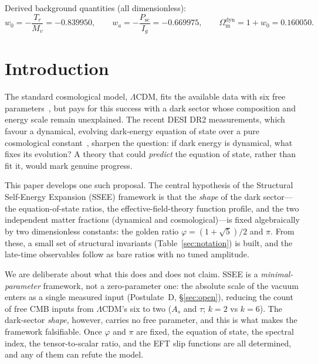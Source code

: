 \documentclass[aps,prd,preprint,amsmath,amssymb,nofootinbib,longbibliography]{revtex4-2}
\newcommand{\Om}{\Omega_{\mathrm{m}}}
\begin{document}
\noindent Derived background quantities (all dimensionless):
\begin{equation*}
w_0=-\frac{T_r}{M_v}=-0.839950,\qquad
w_a=-\frac{P_{\mathrm{sc}}}{I_g}=-0.669975,\qquad
\Om^{\mathrm{dyn}}=1+w_0=0.160050 .
\end{equation*}


\section{Introduction}
\label{sec:intro}

The standard cosmological model, $\Lambda$CDM, fits the available data with six
free parameters~\citep{Planck2018}, but pays for this success with a dark sector whose composition
and energy scale remain unexplained. The recent DESI DR2 measurements, which
favour a dynamical, evolving dark-energy equation of state over a pure
cosmological constant~\citep{AbdulKarim2025}, sharpen the question: if dark
energy is dynamical, what fixes its evolution? A theory that could
\emph{predict} the equation of state, rather than fit it, would mark genuine
progress.

This paper develops one such proposal. The central hypothesis of the
Structural Self-Energy Expansion (SSEE) framework is that the \emph{shape} of
the dark sector---the equation-of-state ratios, the effective-field-theory
function profile, and the two independent matter fractions (dynamical and
cosmological)---is fixed algebraically by two dimensionless constants: the golden
ratio $\varphi=(1+\sqrt5)/2$ and $\pi$. From these, a small set of structural
invariants (Table~\ref{sec:notation}) is built, and the late-time observables
follow as bare ratios with no tuned amplitude.

We are deliberate about what this does and does not claim. SSEE is a
\emph{minimal-parameter} framework, not a zero-parameter one: the absolute scale
of the vacuum enters as a single measured input (Postulate~D,
\S\ref{sec:open}), reducing the count of free CMB inputs from $\Lambda$CDM's
six to two ($A_s$ and $\tau$; $k=2$ vs $k=6$). The dark-sector \emph{shape}, however, carries no free
parameter, and this is what makes the framework falsifiable. Once $\varphi$ and
$\pi$ are fixed, the equation of state, the spectral index, the
tensor-to-scalar ratio, and the EFT slip functions are all determined, and any
of them can refute the model.
\end{document}
